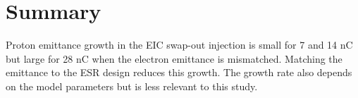 \documentclass{article}
\begin{document}
\section{Summary}
Proton emittance growth in the EIC swap-out injection is small for 7 and 14 nC but large for 28 nC when the electron emittance is mismatched. 
Matching the emittance to the ESR design reduces this growth.
The growth rate also depends on the model parameters but is less relevant to this study.


\end{document}
